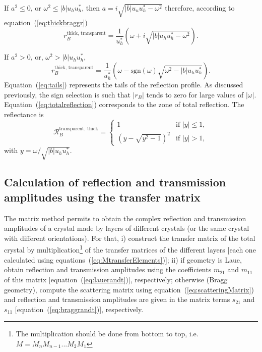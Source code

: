 \documentclass{iucr}
\begin{document}
If $a^2\le0$, or $\omega^2 \le |b|u_h u_h^*$, then $a=i\sqrt{|b|u_u u_h^* - \omega^2}$ therefore, according to equation~(\ref{eq:thickbraggr})
\begin{equation}\label{eq:totalreflection}
    r_B^{\text{thick, transparent}} =
    \frac{1}{u_{h}^*}\left( \omega+i\sqrt{|b|u_h u_h^*-\omega^2} \right).
\end{equation}

If $a^2 > 0$, or, $\omega^2 > |b|u_h u_h^*$,
\begin{equation}\label{eq:tails}
    r_B^{\text{thick, transparent}} =
    \frac{1}{u_{h}^*}\left( \omega-\text{sgn}(\omega)\sqrt{\omega^2-|b|u_h u_h^*} \right).
\end{equation}
Equation~(\ref{eq:tails}) represents the tails of the reflection profile. As discussed previously, the sign selection is such that $|r_B|$ tends to zero for large values of $|\omega|$. Equation~(\ref{eq:totalreflection}) corresponds to the zone of total reflection. The reflectance is
\begin{equation}\label{eq:Darwin}
\mathcal{R}_B^{\text{transparent, thick}} =
    \begin{cases} 
    1
    & \text{if  $|y| \le 1$},\\
    ( y - \sqrt{y^2-1} )^2
    & \text{if $|y|>1$},
    \end{cases}
\end{equation}
with $y=\omega/\sqrt{|b|u_h u_h^*}$. 

\subsection{Calculation of reflection and transmission amplitudes using the transfer matrix}

The matrix method permits to obtain the complex reflection and transmission amplitudes of a crystal made by layers of different crystals (or the same crystal with different orientations). For that,
i) construct the transfer matrix of the total crystal by multiplication\footnote{The multiplication should be done from bottom to top, i.e. $M=M_n M_{n-1}...M_2 M_1$}
of the transfer matrices of the different layers [each one calculated using equations~(\ref{eq:MtransferElements})];
ii) if geometry is Laue, obtain reflection and transmission amplitudes using the coefficients $m_{21}$ and $m_{11}$ of this matrix [equation~(\ref{eq:lauerandt})], respectively; otherwise (Bragg geometry), compute the scattering matrix using equation~(\ref{eq:scatteringMatrix}) and reflection and transmission amplitudes are given in the matrix terms $s_{21}$ and $s_{11}$ [equation~(\ref{eq:braggrandt})], respectively.
\end{document}
